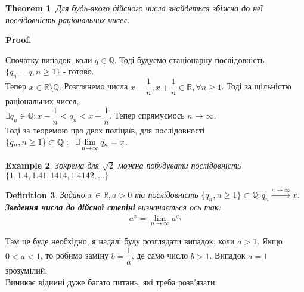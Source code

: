 \documentclass[a4paper, 14pt]{article}
\makeatletter
\def\qed{$\blacksquare$}
\theoremstyle{theoremdd}
\newtheorem{theorem}{Theorem}[subsection]
\theoremstyle{theoremdd}
\newtheorem{definition}[theorem]{Definition}
\theoremstyle{theoremdd}
\theoremstyle{theoremdd}
\newtheorem{example}[theorem]{Example}
\theoremstyle{theoremdd}
\theoremstyle{theoremdd}
\theoremstyle{theoremdd}
\theoremstyle{theoremdd}
\renewenvironment{proof}[1][Proof.\\]{\par
\pushQED{\hfill \qed}%
\normalfont \topsep6\p@\@plus6\p@\relax
\trivlist
\item\relax
{\bfseries
#1\@addpunct{.}}\hspace\labelsep\ignorespaces
}{%
\popQED\endtrivlist\@endpefalse
}
\makeatother
\begin{document}
\begin{theorem}
	Для будь-якого дійсного числа знайдеться збіжна до неї послідовність раціональних чисел.
\end{theorem}
	
	\begin{proof}
	Спочатку випадок, коли $q \in \mathbb{Q}$. Тоді будуємо стаціонарну послідовність $\{q_n = q, n \geq 1\}$ - готово.
	\bigskip \\
	Тепер $x \in \mathbb{R} \setminus \mathbb{Q}$. Розглянемо числа $x - \dfrac{1}{n}, x + \dfrac{1}{n} \in \mathbb{R}, \forall n \geq 1$. Тоді за щільністю раціональних чисел,\\
	$\exists q_n \in \mathbb{Q}: x - \dfrac{1}{n} < q_n < x + \dfrac{1}{n}$. Тепер спрямуємось $n \to \infty$. \\
	Тоді за теоремою про двох поліцаїв, для послідовності $\{q_n, n \geq 1\} \subset \mathbb{Q}: \hspace{0.2cm} \exists \displaystyle\lim_{n \to \infty} q_n = x$.
	\end{proof}
	
	\begin{example}
	Зокрема для $\sqrt{2}$ можна побудувати послідовність $\{1,1.4,1.41,1414,1.4142,\dots\}$
	\end{example}
	
	\iffalse
	\begin{theorem}
	Для будь-якого раціонального числа знайдеться збіжна до неї послідовність ірраціональних чисел.\\
	\textit{Доводиться аналогічно, із використанням щільності ірраціональних чисел.}
	\end{theorem}
	\fi

\begin{definition}
Задано $x \in \mathbb{R}, a > 0$ та послідовність $\{q_n, n \geq 1\} \subset \mathbb{Q}: q_n \overset{n \to \infty}{\longrightarrow} x$.\\
\textbf{Зведення числа до дійсної степіні} визначається ось так:
\begin{align*}
a^x = \displaystyle\lim_{n \to \infty} a^{q_n}
\end{align*}
\end{definition}

Там це буде необхідно, я надалі буду розглядати випадок, коли $a > 1$. Якщо $0 < a < 1$, то робимо заміну $b = \dfrac{1}{a}$, де само число $b > 1$. Випадок $a = 1$ зрозумілий.\\
Виникає віднині дуже багато питань, які треба розв'язати.
\end{document}
